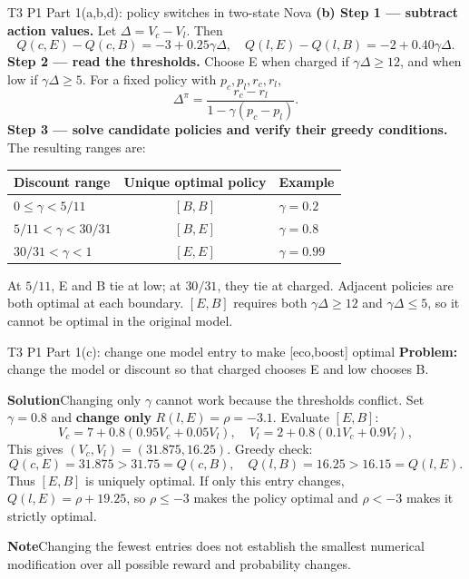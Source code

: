\documentclass[10pt,a4paper]{article}
\newcommand{\ans}{\par\smallskip\textbf{\color{good}Solution\quad}}
\newcommand{\pit}{\par\smallskip\textbf{\color{warn}Note\quad}}
\begin{document}
\begin{question}{T3 P1 Part 1(a,b,d): policy switches in two-state Nova}
\textbf{(b) Step 1 --- subtract action values.} Let $\Delta=V_c-V_l$. Then
\[
Q(c,E)-Q(c,B)=-3+0.25\gamma\Delta,\quad
Q(l,E)-Q(l,B)=-2+0.40\gamma\Delta.
\]
\textbf{Step 2 --- read the thresholds.} Choose E when charged if $\gamma\Delta\ge12$, and when low if $\gamma\Delta\ge5$. For a fixed policy with $p_c,p_l,r_c,r_l$,
\[
\Delta^\pi=\frac{r_c-r_l}{1-\gamma(p_c-p_l)}.
\]
\textbf{Step 3 --- solve candidate policies and verify their greedy conditions.} The resulting ranges are:
\begin{center}
\begin{tabular}{@{}lcl@{}}
\toprule Discount range & Unique optimal policy & Example \\\midrule
$0\le\gamma<5/11$ & $[B,B]$ & $\gamma=0.2$ \\
$5/11<\gamma<30/31$ & $[B,E]$ & $\gamma=0.8$ \\
$30/31<\gamma<1$ & $[E,E]$ & $\gamma=0.99$ \\\bottomrule
\end{tabular}
\end{center}
At $5/11$, E and B tie at low; at $30/31$, they tie at charged. Adjacent policies are both optimal at each boundary. $[E,B]$ requires both $\gamma\Delta\ge12$ and $\gamma\Delta\le5$, so it cannot be optimal in the original model.
\end{question}

\begin{question}{T3 P1 Part 1(c): change one model entry to make [eco,boost] optimal}\label{q:t3p1modify}
\textbf{Problem:} change the model or discount so that charged chooses E and low chooses B.
\ans Changing only $\gamma$ cannot work because the thresholds conflict. Set $\gamma=0.8$ and \textbf{change only} $R(l,E)=\rho=-3.1$. Evaluate $[E,B]$:
\[
V_c=7+0.8(0.95V_c+0.05V_l),\quad
V_l=2+0.8(0.1V_c+0.9V_l),
\]
This gives $(V_c,V_l)=(31.875,16.25)$. Greedy check:
\[
Q(c,E)=31.875>31.75=Q(c,B),\quad
Q(l,B)=16.25>16.15=Q(l,E).
\]
Thus $[E,B]$ is uniquely optimal. If only this entry changes, $Q(l,E)=\rho+19.25$, so $\rho\le-3$ makes the policy optimal and $\rho<-3$ makes it strictly optimal.
\pit Changing the fewest entries does not establish the smallest numerical modification over all possible reward and probability changes.
\end{question}
\end{document}
